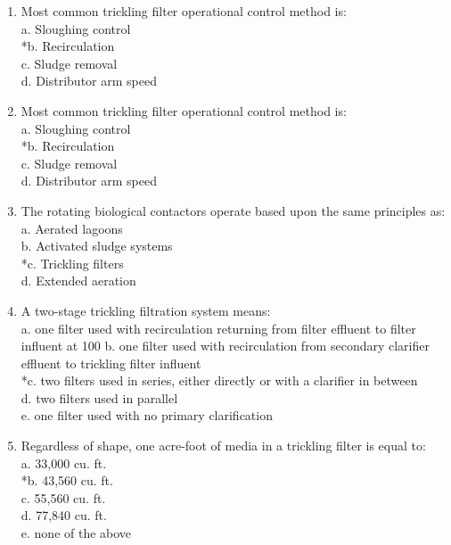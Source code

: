 \begin{enumerate}
\item  Most common trickling filter operational control method is: \\

 a. Sloughing control \\
 *b. Recirculation \\
 c. Sludge removal \\
 d. Distributor arm speed \\


\item  Most common trickling filter operational control method is: \\

 a. Sloughing control \\
 *b. Recirculation \\
 c. Sludge removal \\
 d. Distributor arm speed \\


\item  The rotating biological contactors operate based upon the same principles as: \\

 a. Aerated lagoons \\
 b. Activated sludge systems \\
 *c. Trickling filters \\
 d. Extended aeration \\


\item  A two-stage trickling filtration system means: \\

 a. one filter used with recirculation returning from filter effluent to filter influent at 100%
 b. one filter used with recirculation from secondary clarifier effluent to trickling filter influent \\
 *c. two filters used in series, either directly or with a clarifier in between \\
 d. two filters used in parallel \\
 e. one filter used with no primary clarification \\


\item  Regardless of shape, one acre-foot of media in a trickling filter is equal to: \\

 a. 33,000 cu. ft. \\
 *b. 43,560 cu. ft. \\
 c. 55,560 cu. ft. \\
 d. 77,840 cu. ft. \\
 e. none of the above \\



\end{enumerate}
